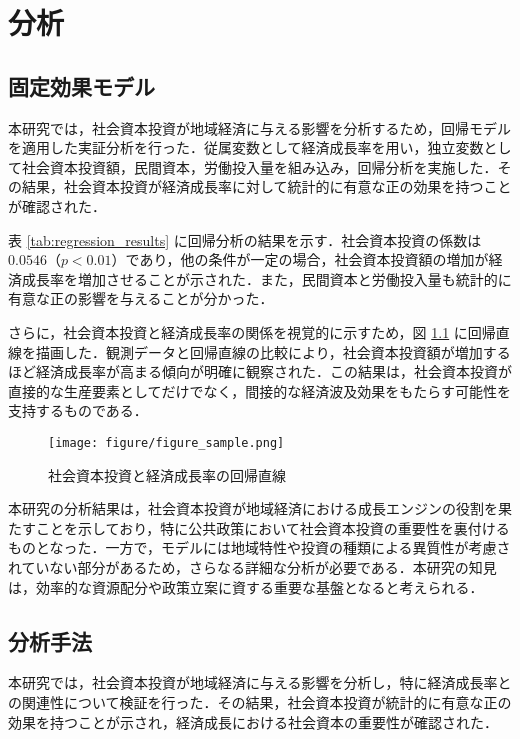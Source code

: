 \chapter{分析}

\section{固定効果モデル}

本研究では，社会資本投資が地域経済に与える影響を分析するため，回帰モデルを適用した実証分析を行った．従属変数として経済成長率を用い，独立変数として社会資本投資額，民間資本，労働投入量を組み込み，回帰分析を実施した．その結果，社会資本投資が経済成長率に対して統計的に有意な正の効果を持つことが確認された．

表 \ref{tab:regression_results} に回帰分析の結果を示す．社会資本投資の係数は \( 0.0546 \)（\( p < 0.01 \)）であり，他の条件が一定の場合，社会資本投資額の増加が経済成長率を増加させることが示された．また，民間資本と労働投入量も統計的に有意な正の影響を与えることが分かった．

さらに，社会資本投資と経済成長率の関係を視覚的に示すため，図 \ref{fig:regression_plot} に回帰直線を描画した．観測データと回帰直線の比較により，社会資本投資額が増加するほど経済成長率が高まる傾向が明確に観察された．この結果は，社会資本投資が直接的な生産要素としてだけでなく，間接的な経済波及効果をもたらす可能性を支持するものである．



\begin{figure}[!ht]
	\centering
	\texttt{[image: figure/figure\_sample.png]}
	\caption{社会資本投資と経済成長率の回帰直線}
	\label{fig:regression_plot}
\end{figure}

本研究の分析結果は，社会資本投資が地域経済における成長エンジンの役割を果たすことを示しており，特に公共政策において社会資本投資の重要性を裏付けるものとなった．一方で，モデルには地域特性や投資の種類による異質性が考慮されていない部分があるため，さらなる詳細な分析が必要である．本研究の知見は，効率的な資源配分や政策立案に資する重要な基盤となると考えられる．

\section{分析手法}

本研究では，社会資本投資が地域経済に与える影響を分析し，特に経済成長率との関連性について検証を行った．その結果，社会資本投資が統計的に有意な正の効果を持つことが示され，経済成長における社会資本の重要性が確認された．

